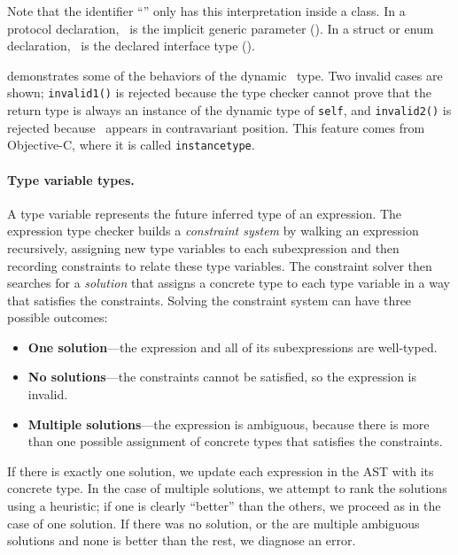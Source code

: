 \documentclass[../generics]{subfiles}
\begin{document}
Note that the identifier ``\tSelf'' only has this interpretation inside a class. In a protocol declaration, \tSelf\ is the implicit generic parameter (). In a struct or enum declaration, \tSelf\ is the declared interface type ().

 demonstrates some of the behaviors of the dynamic \tSelf\ type. Two invalid cases are shown; \texttt{invalid1()} is rejected because the type checker cannot prove that the return type is always an instance of the dynamic type of \texttt{self}, and \texttt{invalid2()} is rejected because \tSelf\ appears in contravariant position.  This feature comes from Objective-C, where it is called \texttt{instancetype}.

\paragraph{Type variable types.}
A type variable represents the future inferred type of an expression. The expression type checker builds a \emph{constraint system} by walking an expression recursively, assigning new type variables to each subexpression and then recording constraints to relate these type variables. The constraint solver then searches for a \emph{solution} that assigns a concrete type to each type variable in a way that satisfies the constraints. Solving the constraint system can have three possible outcomes:
\begin{itemize}
\item \textbf{One solution}---the expression and all of its subexpressions are well-typed.
\item \textbf{No solutions}---the constraints cannot be satisfied, so the expression is invalid.
\item \textbf{Multiple solutions}---the expression is ambiguous, because there is more than one possible assignment of concrete types that satisfies the constraints.
\end{itemize}

If there is exactly one solution, we update each expression in the AST with its concrete type. In the case of multiple solutions, we attempt to rank the solutions using a heuristic; if one is clearly ``better'' than the others, we proceed as in the case of one solution. If there was no solution, or the are multiple ambiguous solutions and none is better than the rest, we diagnose an error.
\end{document}
